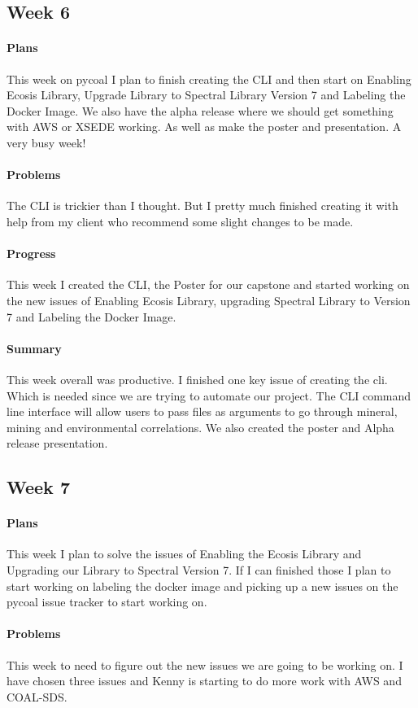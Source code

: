 \documentclass{article}
\begin{document}
\subsection{Week 6}
\paragraph{Plans}
This week on pycoal I plan to finish creating the CLI and then start on Enabling Ecosis Library, Upgrade Library to Spectral Library Version 7 and Labeling the Docker Image. We also have the alpha release where we should get something with AWS or XSEDE working. As well as make the poster and presentation. A very busy week!
\paragraph{Problems}
The CLI is trickier than I thought. But I pretty much finished creating it with help from my client who recommend some slight changes to be made. 
\paragraph{Progress}
This week I created the CLI, the Poster for our capstone and started working on the new issues of Enabling Ecosis Library, upgrading Spectral Library to Version 7 and Labeling the Docker Image. 
\paragraph{Summary}
This week overall was productive. I finished one key issue of creating the cli. Which is needed since we are trying to automate our project. The CLI command line interface will allow users to pass files as arguments to go through mineral, mining and environmental correlations. We also created the poster and Alpha release presentation. 
\subsection{Week 7}
\paragraph{Plans}
This week I plan to solve the issues of Enabling the Ecosis Library and Upgrading our Library to Spectral Version 7. If I can finished those I plan to start working on labeling the docker image and picking up a new issues on the pycoal issue tracker to start working on. 
\paragraph{Problems}
This week to need to figure out the new issues we are going to be working on. I have chosen three issues and Kenny is starting to do more work with AWS and COAL-SDS. 
\end{document}
